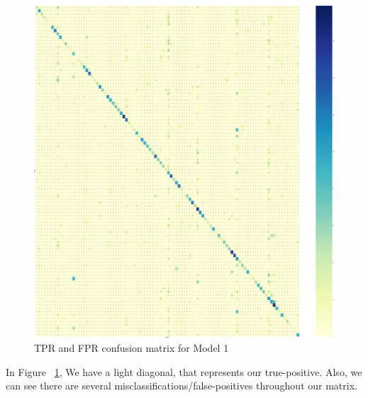 \documentclass[conference]{IEEEtran}
\begin{document}
\begin{figure}[!htbp]
\centerline
{\includegraphics[width=\columnwidth]{images/Conf_101-cropped.pdf}}
\caption{TPR and FPR confusion matrix for Model 1}
\label{fig:CM_101}
\end{figure}
In Figure ~\ref{fig:CM_101}, We have a light diagonal, that represents our true-positive. Also, we can see there are several misclassifications/false-positives throughout our matrix.
\end{document}

